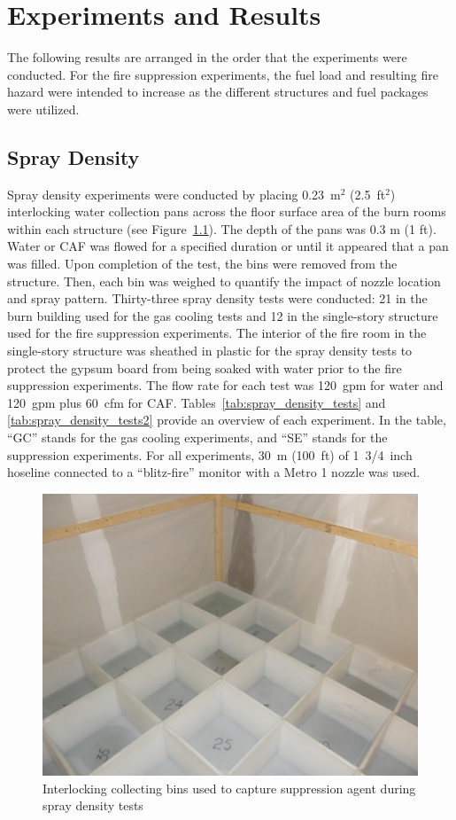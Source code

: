\documentclass[12pt,oneside]{book}
\begin{document}
\chapter{Experiments and Results}
\label{chap:Experiments_and_Results}

The following results are arranged in the order that the experiments were conducted. For the fire suppression experiments, the fuel load and resulting fire hazard were intended to increase as the different structures and fuel packages were utilized.  

\section{Spray Density}
\label{sec:Spray_Density}

Spray density experiments were conducted by placing 0.23~m$^2$ (2.5~ft$^2$) interlocking water collection pans across the floor surface area of the burn rooms within each structure (see Figure~\ref{fig:water_buckets}). The depth of the pans was 0.3 m (1 ft).  Water or CAF was flowed for a specified duration or until it appeared that a pan was filled.  Upon completion of the test, the bins were removed from the structure. Then, each bin was weighed to quantify the impact of nozzle location and spray pattern. Thirty-three spray density tests were conducted: 21 in the burn building used for the gas cooling tests and 12 in the single-story structure used for the fire suppression experiments. The interior of the fire room in the single-story structure was sheathed in plastic for the spray density tests to protect the gypsum board from being soaked with water prior to the fire suppression experiments. The flow rate for each test was 120~gpm for water and 120~gpm plus 60~cfm for CAF. Tables~\ref{tab:spray_density_tests} and \ref{tab:spray_density_tests2} provide an overview of each experiment. In the table, ``GC'' stands for the gas cooling experiments, and ``SE'' stands for the suppression experiments. For all experiments, 30~m (100~ft) of 1~3/4~inch hoseline connected to a ``blitz-fire'' monitor with a Metro 1 nozzle was used.

\begin{figure}[!ht]
	\includegraphics[width=.5\columnwidth]{../Figures/Pictures/Water Tests Bins.png}
	\caption{Interlocking collecting bins used to capture suppression agent during spray density tests}
	\label{fig:water_buckets}
\end{figure}
\end{document}
